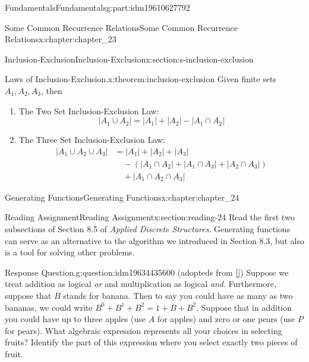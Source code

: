 \documentclass[oneside,10pt,]{book}
\newcommand{\xreffont}{\relax}
\numberwithin{equation}{section}
\begin{document}
\begin{partptx}{Fundamentals}{}{Fundamentals}{}{}{g:part:idm19610627792}
\begin{chapterptx}{Some Common Recurrence Relations}{}{Some Common Recurrence Relations}{}{}{x:chapter:chapter_23}
\begin{sectionptx}{Inclusion-Exclusion}{}{Inclusion-Exclusion}{}{}{x:section:s-inclusion-exclusion}
\begin{theorem}{Laws of Inclusion-Exclusion.}{}{x:theorem:inclusion-exclusion}
Given finite sets \(A_1, A_2, A_3\), then%
\begin{enumerate}[label=(\alph*)]
\item\hypertarget{x:li:ie2}{}The Two Set Inclusion-Exclusion Law:%
\begin{equation*}
\lvert A_1 \cup A_2 \rvert =\lvert A_1 \rvert + \lvert A_2 \rvert - \lvert A_1 \cap A_2 \rvert  
\end{equation*}
%
\item\hypertarget{x:li:ie3}{}The Three Set Inclusion-Exclusion Law:%
\begin{equation*}
\begin{split}
\lvert A_1 \cup A_2 \cup A_3 \rvert & =\lvert A_1 \rvert + \lvert A_2 \rvert + \lvert A_3 \rvert\\
&\quad - (\lvert A_1 \cap A_2 \rvert + \lvert A_1 \cap A_3 \rvert+ \lvert A_2 \cap A_3 \rvert)\\
&\quad + \lvert A_1 \cap A_2 \cap A_3 \rvert
\end{split} 
\end{equation*}
%
\end{enumerate}
%
\end{theorem}
\end{sectionptx}
\end{chapterptx}
%
\typeout{************************************************}
\typeout{************************************************}
%
\begin{chapterptx}{Generating Functions}{}{Generating Functions}{}{}{x:chapter:chapter_24}
\index{}%
%
%
\typeout{************************************************}
\typeout{************************************************}
%
\begin{sectionptx}{Reading Assignment}{}{Reading Assignment}{}{}{x:section:reading-24}
Read the first two subsections of Section 8.5 of \emph{Applied Discrete Structures}. Generating functions can serve as an alternative to the algorithm we introduced in Section 8.3, but also is a tool for solving other problems.%
\begin{question}{Response Question.}{g:question:idm19634435600}%
(adopteds from \hyperlink{x:biblio:biblio-bogart-2017}{[{\xreffont 1}]}) Suppose we treat addition as logical \emph{or} and multiplication as logical \emph{and}.  Furthermore, suppose that \(B\) stands for banana.  Then to say you could have as many as two bananas, we could write \(B^0+B^1+B^2=1+B+B^2\).  Suppose that in addition you could have up to three apples (use \(A\) for apples) and zero or one pears (use \(P\) for pears).  What algebraic expression represents all your choices in selecting fruits?  Identify the part of this expression where you select exactly two pieces of fruit.%

\end{question}
\end{sectionptx}
\end{chapterptx}
\end{partptx}
\end{document}
